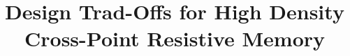 \documentclass[9pt,twocolumn]{IEEEtran}
\begin{document}
\title{\huge\vspace{-0pt} Design Trad-Offs for High Density Cross-Point Resistive Memory}
\maketitle
\vspace{-20pt}


%



%
%


\begin{scriptsize}


\end{scriptsize}
\end{document}
